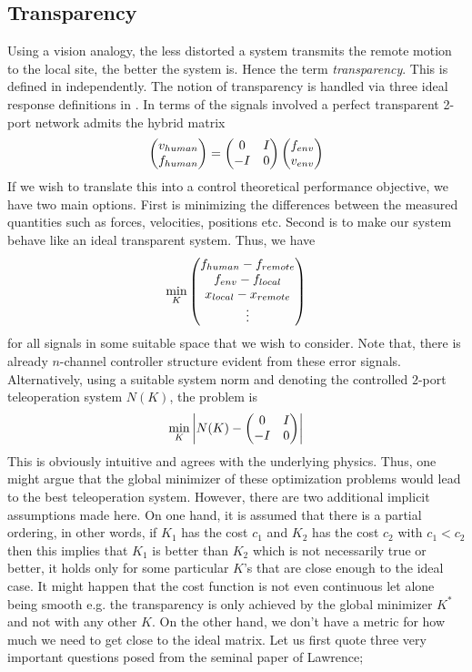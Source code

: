\subsection{Transparency}
Using a vision analogy, the less distorted a system transmits the remote motion to the local site, the better
the system is. Hence the term \emph{transparency}. This is defined in \cite{lawrence,yokokohjiyoshikawa} independently. 
The notion of transparency is handled via three ideal response definitions in \cite{yokokohjiyoshikawa}. In terms 
of the signals involved a perfect transparent 2-port network admits the hybrid matrix 
\[
\begin{pmatrix}v_{human}\\f_{human}\end{pmatrix}=\begin{pmatrix}0&I\\-I&0\end{pmatrix}\begin{pmatrix}f_{env}\\v_{env}\end{pmatrix}
\]
If we wish to translate this into a control theoretical performance objective, we have two main 
options. First is minimizing the differences between the measured quantities such as forces, velocities, positions
etc. Second is to make our system behave like an ideal transparent system. Thus, we have
\[
\min_K \begin{pmatrix}f_{human}-f_{remote}\\f_{env}-f_{local}\\x_{local}-x_{remote}\\\vdots\end{pmatrix} 
\]
for all signals in some suitable space that we wish to consider. Note that, there is already $n$-channel controller
structure evident from these error signals.  Alternatively, using a suitable system norm and denoting the controlled 
$2$-port teleoperation system $N(K)$, the problem is 
\[
\min_K \displaystyle \left|N(K) - \begin{pmatrix}0&I\\-I&0\end{pmatrix}\right|
\]
This is obviously intuitive and agrees with the underlying physics. Thus, one might argue that the global minimizer
of these optimization problems would lead to the best teleoperation system. However, there are two additional implicit 
assumptions made here. On one hand, it is assumed that there is a partial ordering, in other words, if $K_1$ has the cost 
$c_1$ and $K_2$ has the cost $c_2$ with $c_1<c_2$ then this implies that $K_1$ is better than $K_2$ which is not 
necessarily true or better, it holds only for some particular $K$'s that are close enough to the ideal case. It might 
happen that the cost function is not even continuous let alone being smooth e.g. the transparency is only achieved by 
the global minimizer $K^*$ and not with any other $K$. On the other hand, we don't have a metric for how much we need 
to get close to the ideal matrix. Let us first quote three very important questions posed from the seminal paper of Lawrence;
